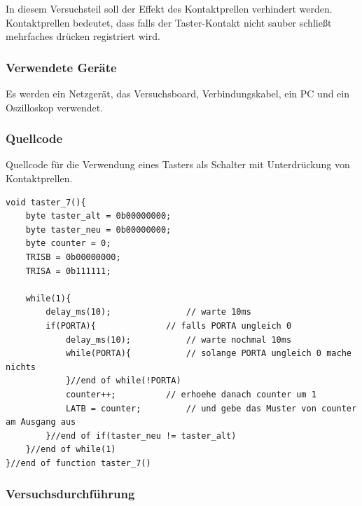 \documentclass[12pt,a4paper]{article}
\begin{document}
In diesem Versuchsteil soll der Effekt des Kontaktprellen verhindert werden. Kontaktprellen bedeutet, dass falls der Taster-Kontakt nicht sauber schließt mehrfaches drücken registriert wird.

\subsubsection*{Verwendete Geräte}

Es werden ein Netzgerät, das Versuchsboard, Verbindungskabel, ein PC und ein Oszilloskop verwendet.

\subsubsection*{Quellcode}

Quellcode für die Verwendung eines Tasters als Schalter mit Unterdrückung von Kontaktprellen.

\lstset{language=C, basicstyle=\tiny}
\begin{lstlisting}[caption = {Verhindern von Kontakprellen}, label=lst:g_10,captionpos=b]
void taster_7(){
	byte taster_alt = 0b00000000;
	byte taster_neu = 0b00000000;
	byte counter = 0;
	TRISB = 0b00000000;
	TRISA = 0b111111;
	
	while(1){
		delay_ms(10);				// warte 10ms
		if(PORTA){				// falls PORTA ungleich 0
			delay_ms(10);			// warte nochmal 10ms
			while(PORTA){			// solange PORTA ungleich 0 mache nichts
			}//end of while(!PORTA)
			counter++;			// erhoehe danach counter um 1 
			LATB = counter;			// und gebe das Muster von counter am Ausgang aus
		}//end of if(taster_neu != taster_alt)
	}//end of while(1)
}//end of function taster_7()
\end{lstlisting}

\subsubsection*{Versuchsdurchführung}
\end{document}
